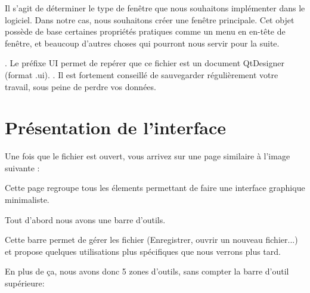 {


Il s'agit de déterminer le type de fenêtre que nous souhaitons implémenter dans le logiciel. Dans notre cas, nous souhaitons créer une fenêtre principale. Cet objet possède de base certaines propriétés pratiques comme un menu en en-tête de fenêtre, et beaucoup d'autres choses qui pourront nous servir pour la suite.

. \newline
Le préfixe UI permet de repérer que ce fichier est un document QtDesigner (format .ui). . \newline \newline 
{\color{red}Il est fortement conseillé de sauvegarder régulièrement votre travail, sous peine de perdre vos données.}




\section{Présentation de l'interface}

Une fois que le fichier  est ouvert, vous arrivez sur une page similaire à l'image suivante : \newline


Cette page regroupe tous les élements permettant de faire une interface graphique minimaliste.


Tout d'abord nous avons une barre d'outils. \newline



Cette barre permet de gérer les fichier (Enregistrer, ouvrir un nouveau fichier...) et propose quelques utilisations plus spécifiques que nous verrons plus tard. \newline

En plus de ça, nous avons donc 5 zones d'outils, sans compter la barre d'outil supérieure: 

}
